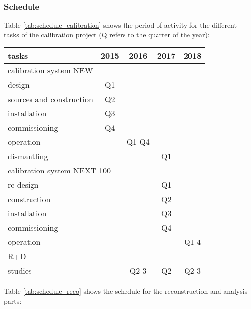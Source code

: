 %
%

\subsubsection*{Schedule}

Table \ref{tab:schedule_calibration} shows the period of activity for the different tasks of the calibration project (Q refers to the quarter of the year):

\begin{center}
\begin{tabular}{| l | c | c | c | c |}
\hline
tasks & 2015 & 2016 & 2017 & 2018 \\
\hline
\hline
\multicolumn{5}{|l|}{calibration system NEW}  \\
\hline
\hline
design & Q1 & & &  \\
sources and construction & Q2 & & & \\
installation & Q3 & & & \\
commissioning  & Q4 & & & \\
operation & & Q1-Q4 & & \\
dismantling &  & & Q1 &  \\
\hline
\hline
\multicolumn{5}{|l|}{calibration system NEXT-100}  \\
\hline
\hline
re-design & & & Q1 &  \\
construction  &  & & Q2 & \\
installation &  & & Q3 & \\
commissioning &  & & Q4 & \\
operation &  & & & Q1-4  \\
\hline
\hline
\multicolumn{5}{|l|}{R+D}  \\
\hline
\hline
studies & & Q2-3 & Q2 & Q2-3 \\ 
\hline
\end{tabular}
\label{tab:schedule_calibration}
\end{center}

Table \ref{tab:schedule_reco} shows the schedule for the reconstruction and analysis parts:

